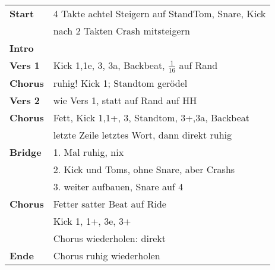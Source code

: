 
\begin{tabular}{p{1.6cm}l}
	\textbf{Start}  & 4 Takte achtel Steigern auf StandTom, Snare, Kick   \\
	                & nach 2 Takten Crash mitsteigern                     \\
	\textbf{Intro}  &                                                     \\
	\textbf{Vers 1} & Kick 1,1e, 3, 3a, Backbeat, $\frac{1}{16}$ auf Rand \\
	\textbf{Chorus} & ruhig! Kick 1; Standtom gerödel                     \\
	\textbf{Vers 2} & wie Vers 1, statt auf Rand auf HH                   \\
	\textbf{Chorus} & Fett, Kick 1,1+, 3, Standtom, 3+,3a, Backbeat       \\
	                & letzte Zeile letztes Wort, dann direkt ruhig        \\
	\textbf{Bridge} & 1. Mal ruhig, nix                                   \\
	                & 2. Kick und Toms, ohne Snare, aber Crashs           \\
	                & 3. weiter aufbauen, Snare auf 4                     \\
	\textbf{Chorus} & Fetter satter Beat auf Ride                         \\
	                & Kick 1, 1+, 3e, 3+                                  \\
	                & Chorus wiederholen: direkt                          \\
	\textbf{Ende}   & Chorus ruhig wiederholen                            \\
\end{tabular}
